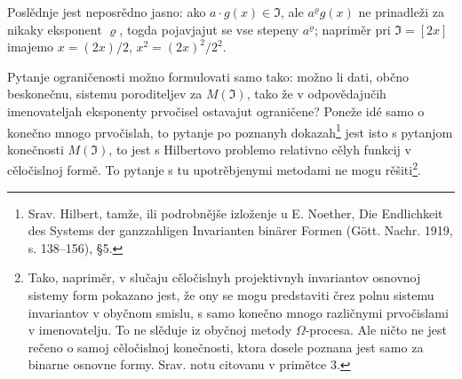 \documentclass[11pt]{article}
\begin{document}
Poslědnje jest neposrědno jasno: ako \(a\cdot g(x)\in\mathfrak{I}\), ale \(a^\varrho g(x)\) ne prinadleži za nikaky eksponent \(\varrho\), togda pojavjajut se vse stepeny \(a^\varrho\); napriměr pri \(\mathfrak{I}=[2x]\) imajemo \(x=(2x)/2\), \(x^2=(2x)^2/2^2\).

Pytanje ograničenosti možno formulovati samo tako: možno li dati, občno beskonečnu, sistemu poroditeljev za \(M(\mathfrak{I})\), tako že v odpovědajučih imenovateljah eksponenty prvočisel ostavajut ograničene? Poneže idé samo o konečno mnogo prvočislah, to pytanje po poznanyh dokazah\footnote{Srav. Hilbert, tamže, ili podrobnějše izloženje u E. Noether, Die Endlichkeit des Systems der ganzzahligen Invarianten binärer Formen (Gött. Nachr. 1919, s. 138--156), §5.} jest isto s pytanjom konečnosti \(M(\mathfrak{I})\), to jest s Hilbertovo problemo relativno cělyh funkcij v cěločislnoj formě. To pytanje s tu upotrěbjenymi metodami ne mogu rěšiti\footnote{Tako, napriměr, v slučaju cěločislnyh projektivnyh invariantov osnovnoj sistemy form pokazano jest, že ony se mogu predstaviti črez polnu sistemu invariantov v obyčnom smislu, s samo konečno mnogo različnymi prvočislami v imenovatelju. To ne slěduje iz obyčnoj metody \(\Omega\)-procesa. Ale ničto ne jest rečeno o samoj cěločislnoj konečnosti, ktora dosele poznana jest samo za binarne osnovne formy. Srav. notu citovanu v primětce 3.}.
\end{document}
